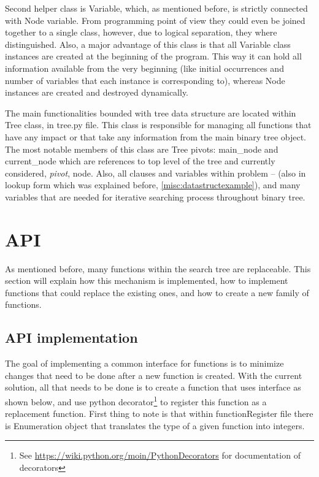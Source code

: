 \documentclass[12pt,english,pdflatex]{aghdpl}
\begin{document}
Second helper class is Variable, which, as mentioned before, is strictly
connected with Node variable. From programming point of view they
could even  be joined together to a single class, however, due to logical
separation, they where distinguished. Also, a major advantage of this
class is that all Variable class instances are created at the beginning
of the program. This way it can hold all information available from the
very beginning (like initial occurrences and number of variables that
each instance is corresponding to), whereas Node instances are created
and destroyed dynamically.

The main functionalities bounded with tree data structure are located
within Tree class, in tree.py file. This class is responsible for
managing all functions that have any impact or that take any information
from the main binary tree object. The most notable members of this class
are Tree pivots: main\_node and current\_node which are references
to top level of the tree and currently considered, \textit{pivot}, node. Also, all clauses
and variables within problem -- (also in lookup form which was explained
before, \ref{misc:datastructexample}), and many variables that are needed for iterative searching
process throughout binary tree.

\section{API}
\label{sec:API}

As mentioned before, many functions within the search tree are replaceable.
This section will explain how  this mechanism is implemented, how to
implement functions that could replace the existing ones, and how to create
a new family of functions.

\subsection{API implementation}
\label{subsec:APIimpl}
The goal of implementing a common interface for functions is to minimize
changes that need to be done after a new function is created. With
the current solution, all that needs to be done is to create a function
that uses interface as shown below, and use python decorator\footnote{See \url{https://wiki.python.org/moin/PythonDecorators} for documentation of decorators} to register
this function as a replacement function. First thing to note is that
within functionRegister file there is Enumeration object that translates
the type of a given function into integers. 
\end{document}
